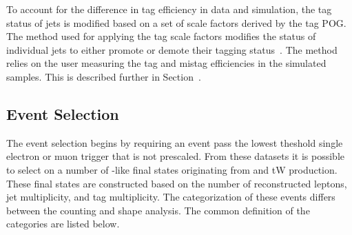To account for the difference in \PQb tag efficiency in data and simulation, the \PQb tag status of jets is modified based on a set of scale factors derived by the \PQb tag POG.  The method used for applying the \PQb tag scale factors modifies the status of individual jets to either promote or demote their \PQb tagging status~\cite{twiki:btag_method}.  The method relies on the user measuring the \PQb tag and mistag efficiencies in the simulated samples.  This is described further in Section~\label{sec:analysis:calibration:btag}.


\FloatBarrier

\subsection{Event Selection}
\label{sec:analysis:selection:event}

The event selection begins by requiring an event pass the lowest \pt theshold single electron or muon trigger that is not prescaled. From these datasets it is possible to select on a number of \WW-like final states originating from \ttbar and tW production.  These final states are constructed based on the number of reconstructed leptons, jet multiplicity, and \PQb tag multiplicity.  The categorization of these events differs between the counting and shape analysis.  The common definition of the categories are listed below.


